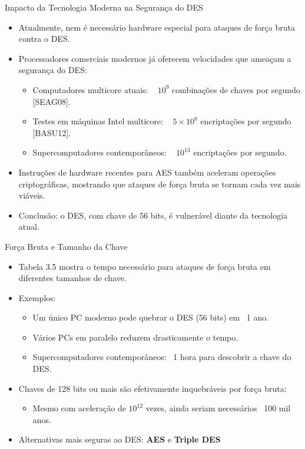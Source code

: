 \begin{frame}{Impacto da Tecnologia Moderna na Segurança do DES}
    \begin{itemize}
        \item Atualmente, nem é necessário hardware especial para ataques de força bruta contra o DES.
        \item Processadores comerciais modernos já oferecem velocidades que ameaçam a segurança do DES:
              \begin{itemize}
                  \item Computadores multicore atuais: ~ $10^9$ combinações de chaves por segundo [SEAG08].
                  \item Testes em máquinas Intel multicore: ~ $5 \times 10^8$ encriptações por segundo [BASU12].
                  \item Supercomputadores contemporâneos: ~ $10^{13}$ encriptações por segundo.
              \end{itemize}
        \item Instruções de hardware recentes para AES também aceleram operações criptográficas, mostrando que ataques de força bruta se tornam cada vez mais viáveis.
        \item Conclusão: o DES, com chave de 56 bits, é vulnerável diante da tecnologia atual.
    \end{itemize}
\end{frame}

\begin{frame}{Força Bruta e Tamanho da Chave}
    \begin{itemize}
        \item Tabela 3.5 mostra o tempo necessário para ataques de força bruta em diferentes tamanhos de chave.
        \item Exemplos:
              \begin{itemize}
                  \item Um único PC moderno pode quebrar o DES (56 bits) em ~1 ano.
                  \item Vários PCs em paralelo reduzem drasticamente o tempo.
                  \item Supercomputadores contemporâneos: ~1 hora para descobrir a chave do DES.
              \end{itemize}
        \item Chaves de 128 bits ou mais são efetivamente inquebráveis por força bruta:
              \begin{itemize}
                  \item Mesmo com aceleração de $10^{12}$ vezes, ainda seriam necessários ~100 mil anos.
              \end{itemize}
        \item Alternativas mais seguras ao DES: \textbf{AES} e \textbf{Triple DES}
    \end{itemize}
\end{frame}

